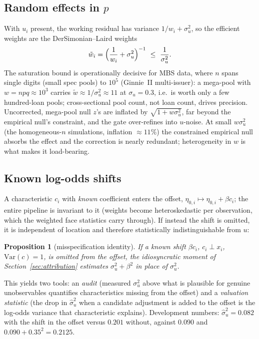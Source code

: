 \documentclass[11pt]{article}
\newtheorem{proposition}{Proposition}[section]
\newcommand{\Var}{\mathrm{Var}}
\begin{document}
\subsection{Random effects in $p$}
With $u_i$ present, the working residual has variance $1/w_i+\sigma_u^2$, so the
efficient weights are the DerSimonian--Laird weights
\begin{equation}\label{eq:dlw}
\tilde w_i=\Bigl(\frac{1}{w_i}+\sigma_u^2\Bigr)^{-1}\ \le\ \frac{1}{\sigma_u^2}.
\end{equation}
The saturation bound is operationally decisive for MBS data, where $n$ spans single
digits (small spec pools) to $10^5$ (Ginnie~II multi-issuer): a mega-pool with
$w=npq\approx 10^3$ carries $\tilde w\approx 1/\sigma_u^2\approx 11$ at
$\sigma_u=0.3$, i.e.\ is worth only a few hundred-loan pools; cross-sectional pool
count, not loan count, drives precision. Uncorrected, mega-pool null $z$'s are inflated
by $\sqrt{1+w\sigma_u^2}$, far beyond the empirical null's constraint, and the gate
over-refines into $u$-noise. At small $w\sigma_u^2$ (the homogeneous-$n$ simulations,
inflation $\approx 11\%$) the constrained empirical null absorbs the effect and the
correction is nearly redundant; heterogeneity in $w$ is what makes it load-bearing.

\subsection{Known log-odds shifts}
A characteristic $c_i$ with \emph{known} coefficient enters the offset,
$\eta_{0,i}\mapsto\eta_{0,i}+\beta c_i$; the entire pipeline is invariant to it (weights
become heteroskedastic per observation, which the weighted face statistics carry
through). If instead the shift is omitted, it is independent of location and therefore
statistically indistinguishable from $u$:

\begin{proposition}[misspecification identity]\label{prop:audit}
If a known shift $\beta c_i$, $c_i\perp x_i$, $\Var(c)=1$, is omitted from the offset,
the idiosyncratic moment of Section~\ref{sec:attribution} estimates
$\sigma_u^2+\beta^2$ in place of $\sigma_u^2$.
\end{proposition}

\noindent This yields two tools: an \emph{audit} (measured $\sigma_u^2$ above what is
plausible for genuine unobservables quantifies characteristics missing from the
offset) and a \emph{valuation statistic} (the drop in $\hat\sigma_u^2$ when a candidate
adjustment is added to the offset is the log-odds variance that characteristic
explains). Development numbers: $\hat\sigma_u^2=0.082$ with the shift in the offset
versus $0.201$ without, against $0.090$ and $0.090+0.35^2=0.2125$.
\end{document}
